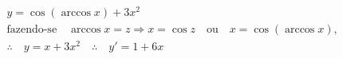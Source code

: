 \begin{ex}
\begin{align}
&y=\cos{(\arccos{x})}+3x^2\nonumber\\
&\text{fazendo-se}\quad \arccos{x}=z \Rightarrow x=\cos{z}\quad\text{ou}\quad x=\cos{(\arccos{x})},\nonumber\\
&\therefore\quad y=x+3x^2\quad \therefore\quad y'=1+6x\nonumber
\end{align}
\end{ex}